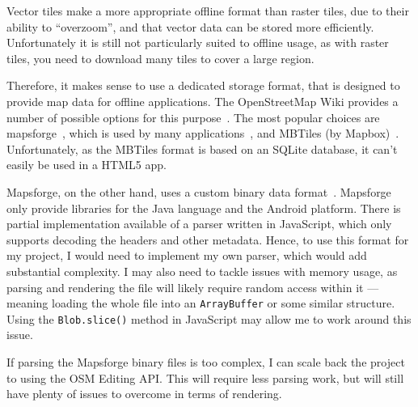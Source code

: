 Vector tiles make a more appropriate offline format than raster tiles, due to their ability to ``overzoom'', and that vector data can be stored more efficiently. Unfortunately it is still not particularly suited to offline usage, as with raster tiles, you need to download many tiles to cover a large region.

Therefore, it makes sense to use a dedicated storage format, that is designed to provide map data for offline applications. The OpenStreetMap Wiki provides a number of possible options for this purpose~\cite{osm-wiki-offline}. The most popular choices are mapsforge~\cite{mapsforge}, which is used by many applications~\cite{apps-using-mapsforge}, and MBTiles (by Mapbox)~\cite{mapbox-mbtiles}. Unfortunately, as the MBTiles format is based on an SQLite database, it can't easily be used in a HTML5 app.

Mapsforge, on the other hand, uses a custom binary data format~\cite{mapsforge-binary-format}. Mapsforge only provide libraries for the Java language and the Android platform. There is partial implementation available of a parser written in JavaScript, which only supports decoding the headers and other metadata. Hence, to use this format for my project, I would need to implement my own parser, which would add substantial complexity. I may also need to tackle issues with memory usage, as parsing and rendering the file will likely require random access within it --- meaning loading the whole file into an \texttt{ArrayBuffer} or some similar structure. Using the \texttt{Blob.slice()} method in JavaScript may allow me to work around this issue.

If parsing the Mapsforge binary files is too complex, I can scale back the project to using the OSM Editing API\@. This will require less parsing work, but will still have plenty of issues to overcome in terms of rendering.
